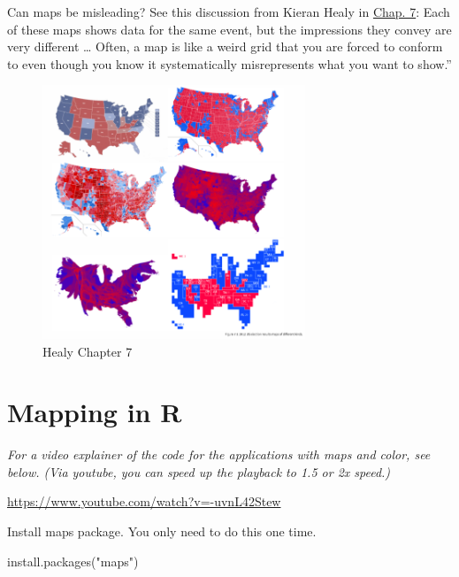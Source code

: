 \documentclass[
  letterpaper,
  DIV=11,
  numbers=noendperiod]{scrreprt}
\newenvironment{Shaded}{\begin{snugshade}}{\end{snugshade}}
\newcommand{\FunctionTok}[1]{\textcolor[rgb]{0.28,0.35,0.67}{#1}}
\newcommand{\NormalTok}[1]{\textcolor[rgb]{0.00,0.23,0.31}{#1}}
\newcommand{\StringTok}[1]{\textcolor[rgb]{0.13,0.47,0.30}{#1}}
\begin{document}
Can maps be misleading? See this discussion from Kieran Healy in
\href{https://socviz.co/maps.html\#maps}{Chap. 7}: Each of these maps
shows data for the same event, but the impressions they convey are very
different \ldots{} Often, a map is like a weird grid that you are forced
to conform to even though you know it systematically misrepresents what
you want to show.''

\begin{figure}

{\centering \includegraphics[width=0.7\textwidth,height=\textheight]{images/healymap.png}

}

\caption{Healy Chapter 7}

\end{figure}

\hypertarget{mapping-in-r}{%
\section{Mapping in R}\label{mapping-in-r}}

\emph{For a video explainer of the code for the applications with maps
and color, see below. (Via youtube, you can speed up the playback to 1.5
or 2x speed.)}

\url{https://www.youtube.com/watch?v=-uvnL42Stew}

Install maps package. You only need to do this one time.

\begin{Shaded}
\begin{Highlighting}[]
\FunctionTok{install.packages}\NormalTok{(}\StringTok{"maps"}\NormalTok{)}
\end{Highlighting}
\end{Shaded}
\end{document}
